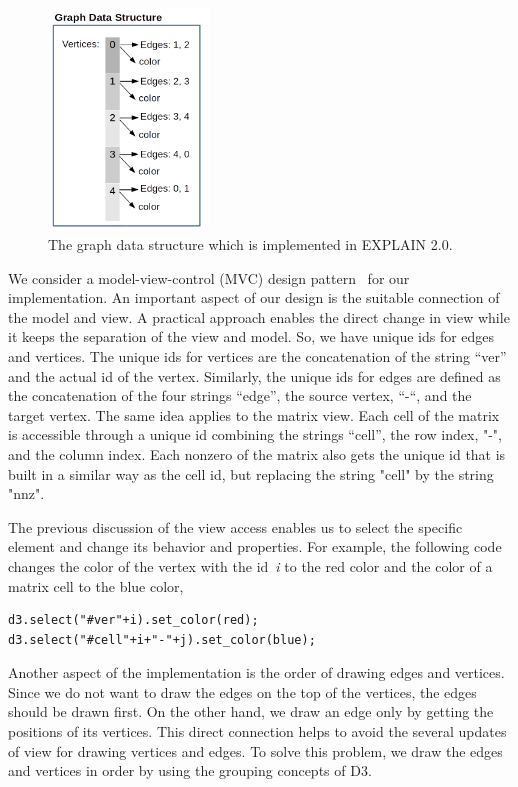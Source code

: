 \documentclass[12pt, twoside,a4paper,toc=bibliography]{scrbook}
\begin{document}
\begin{figure}
\centering
\includegraphics[width=0.38\textwidth]{graph}
\caption{The graph data structure which is implemented in EXPLAIN 2.0.}
\label{f.graph-ds}
\end{figure}
We consider a model-view-control (MVC) design pattern~\cite{osmani2012learning} for our implementation.
An important aspect of our design is the suitable connection of the
model and view. A practical approach enables the direct change in view while it keeps the
separation of the view and model.
So, we have unique ids for
edges and vertices. The unique ids for vertices are the concatenation of the
string “ver” and the actual id of the vertex. Similarly, the unique ids for edges are
defined as the concatenation of the four strings “edge”, the source vertex, “-“,
and the target vertex. The same idea applies to the matrix view. Each cell of the matrix
is accessible through a unique id combining the strings “cell”, the row index,
"-", and the column index.
Each nonzero of the matrix also gets the unique id that is built in a similar way
as the cell id, but replacing the string "cell" by the string "nnz".

The previous discussion of the view access enables us to select the
specific element and change its behavior and properties. For example, the following
code changes the color of the vertex with the id~\textit{i} to the red color
and the color of a matrix cell to the blue color,
\begin{lstlisting}
d3.select("#ver"+i).set_color(red);
d3.select("#cell"+i+"-"+j).set_color(blue);
\end{lstlisting}

Another aspect of the implementation is the order of drawing edges and
vertices. Since we do not want to draw the edges on the top of the vertices,
the edges should be drawn first. On the other hand, we draw an edge
only by getting the positions of its vertices. This direct connection helps to avoid
the several updates of view for drawing vertices and edges.
To solve this problem,
we draw the edges and vertices in order by using the grouping concepts of D3.
\end{document}
